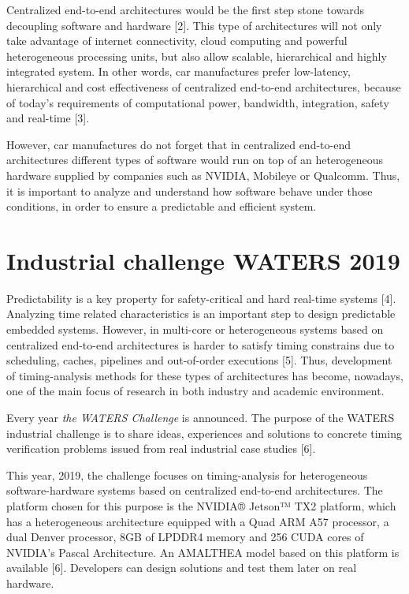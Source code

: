 \documentclass[
  12pt,
  a4paperpaper,
]{report}
\begin{document}
Centralized end-to-end architectures would be the first step stone
towards decoupling software and hardware {[}2{]}. This type of
architectures will not only take advantage of internet connectivity,
cloud computing and powerful heterogeneous processing units, but also
allow scalable, hierarchical and highly integrated system.
In other words, car manufactures prefer low-latency,
hierarchical and cost effectiveness of centralized end-to-end
architectures, because of today's requirements of computational power,
bandwidth, integration, safety and real-time {[}3{]}.

However, car manufactures do not forget that in centralized
end-to-end architectures different types of software would run on top
of an heterogeneous hardware supplied by companies such as NVIDIA,
Mobileye or Qualcomm. Thus, it is important to analyze and understand how
software behave under those conditions, in order to ensure a
predictable and efficient system.

\hypertarget{industrial-challenge-waters-2019}{%
\section{Industrial challenge WATERS
2019}\label{industrial-challenge-waters-2019}}

Predictability is a key property for safety-critical and hard real-time
systems {[}4{]}. Analyzing time related characteristics is an important
step to design predictable embedded systems. However, in multi-core or
heterogeneous systems based on centralized end-to-end architectures is
harder to satisfy timing constrains due to scheduling, caches,
pipelines and out-of-order executions {[}5{]}. 
Thus, development of timing-analysis methods for these types of
architectures has become, nowadays, one of the main focus of research in
both industry and academic environment.

Every year \emph{the WATERS Challenge} is announced.
The purpose of the WATERS industrial challenge is to
share ideas, experiences and solutions to concrete timing verification
problems issued from real industrial case studies {[}6{]}.

This year, 2019, the challenge focuses on timing-analysis for
heterogeneous software-hardware systems based on centralized end-to-end
architectures. The platform chosen for this purpose is the NVIDIA®
Jetson™ TX2 platform, which has a heterogeneous architecture equipped
with a Quad ARM A57 processor, a dual Denver processor, 8GB of LPDDR4
memory and 256 CUDA cores of NVIDIA's Pascal Architecture. 
An AMALTHEA model based on this platform is available {[}6{]}.
Developers can design solutions and test them later on real hardware.
\end{document}
